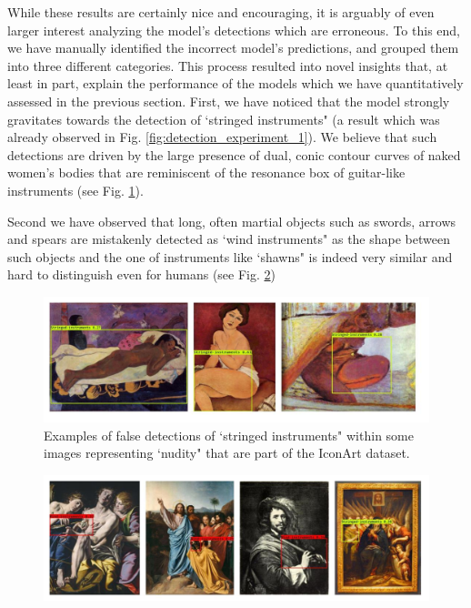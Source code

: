 While these results are certainly nice and encouraging, it is arguably of even larger interest analyzing the model's detections which are erroneous. To this end, we have manually identified the incorrect model's predictions, and grouped them into three different categories. This process resulted into novel insights that, at least in part, explain the performance of the models which we have quantitatively assessed in the previous section. First, we have noticed that the model strongly gravitates towards the detection of `stringed instruments" (a result which was already observed in Fig. \ref{fig:detection_experiment_1}). We believe that such detections are driven by the large presence of dual, conic contour curves of naked women's bodies that are reminiscent of the resonance box of guitar-like instruments (see Fig. \ref{fig:false_positives_1}). 

Second we have observed that long, often martial objects such as swords, arrows and spears are mistakenly detected as `wind instruments" as the shape between such objects and the one of instruments like `shawns" is indeed very similar and hard to distinguish even for humans (see Fig. \ref{fig:false_positives_2})



\begin{figure}[ht!]
\centering
  \includegraphics[width=\linewidth]{./Images/Chapter05/false_positives_1}
  \caption{Examples of false detections of `stringed instruments" within some images representing `nudity" that are part of the IconArt dataset.}
  \label{fig:false_positives_1}
\end{figure}


\begin{figure}[ht!]
\centering
  \includegraphics[width=\linewidth]{./Images/Chapter05/false_positives_2}
  \caption{}
  \label{fig:false_positives_2}
\end{figure}


